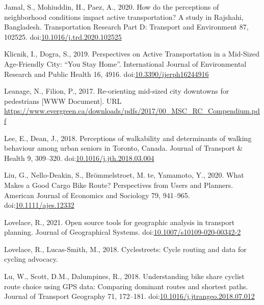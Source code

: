 \documentclass[]{elsarticle} %
\begin{document}
\leavevmode\hypertarget{ref-jamalHowPerceptionsNeighborhood2020}{}%
Jamal, S., Mohiuddin, H., Paez, A., 2020. How do the perceptions of
neighborhood conditions impact active transportation? A study in
Rajshahi, Bangladesh. Transportation Research Part D: Transport and
Environment 87, 102525.
doi:\href{https://doi.org/10.1016/j.trd.2020.102525}{10.1016/j.trd.2020.102525}

\leavevmode\hypertarget{ref-klicnikPerspectivesActiveTransportation2019}{}%
Klicnik, I., Dogra, S., 2019. Perspectives on Active Transportation in a
Mid-Sized Age-Friendly City: ``You Stay Home''. International Journal of
Environmental Research and Public Health 16, 4916.
doi:\href{https://doi.org/10.3390/ijerph16244916}{10.3390/ijerph16244916}

\leavevmode\hypertarget{ref-leanagereorientingmidsized2017}{}%
Leanage, N., Filion, P., 2017. Re-orienting mid-sized city downtowns for
pedestrians {[}WWW Document{]}. URL
\url{https://www.evergreen.ca/downloads/pdfs/2017/00_MSC_RC_Compendium.pdf}

\leavevmode\hypertarget{ref-leePerceptionsWalkabilityDeterminants2018}{}%
Lee, E., Dean, J., 2018. Perceptions of walkability and determinants of
walking behaviour among urban seniors in Toronto, Canada. Journal of
Transport \& Health 9, 309--320.
doi:\href{https://doi.org/10.1016/j.jth.2018.03.004}{10.1016/j.jth.2018.03.004}

\leavevmode\hypertarget{ref-liuWhatMakesGood2020}{}%
Liu, G., Nello-Deakin, S., Brömmelstroet, M. te, Yamamoto, Y., 2020.
What Makes a Good Cargo Bike Route? Perspectives from Users and
Planners. American Journal of Economics and Sociology 79, 941--965.
doi:\href{https://doi.org/10.1111/ajes.12332}{10.1111/ajes.12332}

\leavevmode\hypertarget{ref-lovelaceOpenSource2021}{}%
Lovelace, R., 2021. Open source tools for geographic analysis in
transport planning. Journal of Geographical Systems.
doi:\href{https://doi.org/10.1007/s10109-020-00342-2}{10.1007/s10109-020-00342-2}

\leavevmode\hypertarget{ref-Lovelace2018}{}%
Lovelace, R., Lucas-Smith, M., 2018. Cyclestreets: Cycle routing and
data for cycling advocacy.

\leavevmode\hypertarget{ref-luUnderstandingBikeShare2018}{}%
Lu, W., Scott, D.M., Dalumpines, R., 2018. Understanding bike share
cyclist route choice using GPS data: Comparing dominant routes and
shortest paths. Journal of Transport Geography 71, 172--181.
doi:\href{https://doi.org/10.1016/j.jtrangeo.2018.07.012}{10.1016/j.jtrangeo.2018.07.012}
\end{document}
